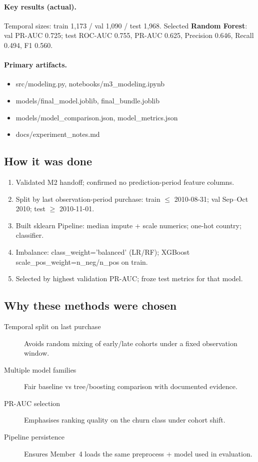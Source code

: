 \documentclass[11pt,a4paper]{article}
\renewcommand{\texttt}[1]{#1}
\begin{document}
\paragraph{Key results (actual).}
Temporal sizes: train 1{,}173 / val 1{,}090 / test 1{,}968.
Selected \textbf{Random Forest}: val PR-AUC 0.725; test ROC-AUC 0.755,
PR-AUC 0.625, Precision 0.646, Recall 0.494, F1 0.560.

\paragraph{Primary artifacts.}
\begin{itemize}
  \item \texttt{src/modeling.py}, \texttt{notebooks/m3\_modeling.ipynb}
  \item \texttt{models/final\_model.joblib}, \texttt{final\_bundle.joblib}
  \item \texttt{models/model\_comparison.json}, \texttt{model\_metrics.json}
  \item \texttt{docs/experiment\_notes.md}
\end{itemize}

\subsection{How it was done}
\begin{enumerate}
  \item Validated M2 handoff; confirmed no prediction-period feature columns.
  \item Split by last observation-period purchase:
        train $\le$ 2010-08-31; val Sep--Oct 2010; test $\ge$ 2010-11-01.
  \item Built sklearn \texttt{Pipeline}: median impute + scale numerics;
        one-hot \texttt{country}; classifier.
  \item Imbalance: \texttt{class\_weight='balanced'} (LR/RF);
        XGBoost \texttt{scale\_pos\_weight}=n\_neg/n\_pos on train.
  \item Selected by highest validation PR-AUC; froze test metrics for that model.
\end{enumerate}

\subsection{Why these methods were chosen}
\begin{description}
  \item[Temporal split on last purchase]
        Avoids random mixing of early/late cohorts under a fixed observation window.
  \item[Multiple model families]
        Fair baseline vs tree/boosting comparison with documented evidence.
  \item[PR-AUC selection]
        Emphasises ranking quality on the churn class under cohort shift.
  \item[Pipeline persistence]
        Ensures Member~4 loads the same preprocess + model used in evaluation.
\end{description}
\end{document}
